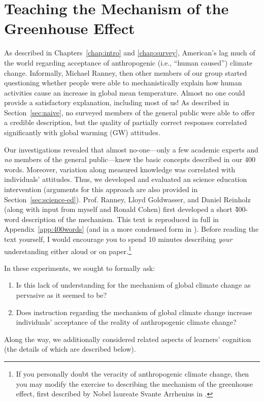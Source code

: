 \graphicspath{{mechanism/}}

\chapter{Teaching the Mechanism of the Greenhouse Effect}
\label{chap:mechanism}

As described in Chapters~\ref{chap:intro} and \ref{chap:survey}, American's lag
much of the world regarding acceptance of anthropogenic (i.e., “human caused”)
climate change. Informally, Michael Ranney, then other members of our group
started questioning whether people were able to mechanistically explain how
human activities cause an increase in global mean temperature.  Almost no one
could provide a satisfactory explanation, including most of us! As described in
Section~\ref{sec:naive}, no surveyed members of the general public were able to
offer a credible description, but the quality of partially correct responses
correlated significantly with global warming (GW) attitudes. 

Our investigations revealed that almost no-one---only a few academic
experts and \emph{no} members of the general public---knew the basic
concepts described in our 400 words. Moreover, variation along measured
knowledge was correlated with individuals' attitudes. Thus, we developed and evaluated an
science education intervention (arguments for this approach are also provided in
Section~\ref{sec:science-ed}). Prof. Ranney, Lloyd Goldwasser, and Daniel
Reinholz (along with input from myself and Ronald Cohen) first developed a
short \~400-word description of the mechanism. This text is reproduced in full
in Appendix~\ref{app:400words} (and in a more condensed form in
\cite{ranney_improving_2012_f}).  Before reading the text yourself, I would
encourage you to spend 10 minutes describing \emph{your} understanding either
aloud or on paper.\footnote{If you personally doubt the veracity of
    anthropogenic climate change, then you may modify the exercise to describing
    the mechanism of the greenhouse effect, first described by Nobel laureate
    Svante Arrhenius in \citeyear{arrhenius_influence_1896}.}

 In these experiments, we sought to formally ask:
\begin{enumerate}
\item Is this lack of understanding for the mechanism of global climate change
    as pervasive as it seemed to be?
\item Does instruction regarding the mechanism of global climate change increase
    individuals' acceptance of the reality of anthropogenic climate change?
\end{enumerate}
Along the way, we additionally considered related aspects of learners'
cognition (the details of which are described below).

